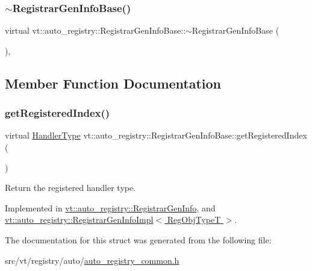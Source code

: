 \subsubsection{\texorpdfstring{$\sim$\+Registrar\+Gen\+Info\+Base()}{~RegistrarGenInfoBase()}}
{\footnotesize\ttfamily virtual vt\+::auto\+\_\+registry\+::\+Registrar\+Gen\+Info\+Base\+::$\sim$\+Registrar\+Gen\+Info\+Base (\begin{DoxyParamCaption}{ }\end{DoxyParamCaption})\hspace{0.3cm}{\ttfamily [inline]}, {\ttfamily [virtual]}}



\subsection{Member Function Documentation}
\mbox{\label{structvt_1_1auto__registry_1_1_registrar_gen_info_base_ac498c953bb4a951399d66272cae76b05}} 
\subsubsection{\texorpdfstring{get\+Registered\+Index()}{getRegisteredIndex()}}
{\footnotesize\ttfamily virtual \hyperlink{namespacevt_af64846b57dfcaf104da3ef6967917573}{Handler\+Type} vt\+::auto\+\_\+registry\+::\+Registrar\+Gen\+Info\+Base\+::get\+Registered\+Index (\begin{DoxyParamCaption}{ }\end{DoxyParamCaption})\hspace{0.3cm}{\ttfamily [pure virtual]}}



Return the registered handler type. 



Implemented in \hyperlink{structvt_1_1auto__registry_1_1_registrar_gen_info_a749795c8978dbc76aa851182cb00b1b9}{vt\+::auto\+\_\+registry\+::\+Registrar\+Gen\+Info}, and \hyperlink{structvt_1_1auto__registry_1_1_registrar_gen_info_impl_a7e3d92f9e79462abad5dfcf726703956}{vt\+::auto\+\_\+registry\+::\+Registrar\+Gen\+Info\+Impl$<$ Reg\+Obj\+Type\+T $>$}.



The documentation for this struct was generated from the following file\+:\begin{DoxyCompactItemize}
\item 
src/vt/registry/auto/\hyperlink{auto__registry__common_8h}{auto\+\_\+registry\+\_\+common.\+h}\end{DoxyCompactItemize}
